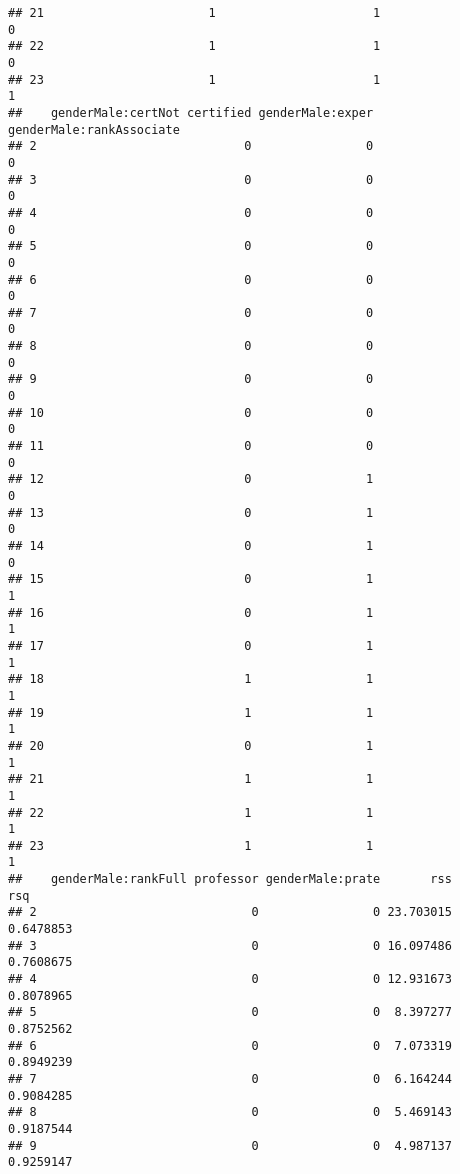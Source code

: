 \documentclass[]{article}
\begin{document}
\begin{verbatim}
## 21                       1                      1                       0
## 22                       1                      1                       0
## 23                       1                      1                       1
##    genderMale:certNot certified genderMale:exper genderMale:rankAssociate
## 2                             0                0                        0
## 3                             0                0                        0
## 4                             0                0                        0
## 5                             0                0                        0
## 6                             0                0                        0
## 7                             0                0                        0
## 8                             0                0                        0
## 9                             0                0                        0
## 10                            0                0                        0
## 11                            0                0                        0
## 12                            0                1                        0
## 13                            0                1                        0
## 14                            0                1                        0
## 15                            0                1                        1
## 16                            0                1                        1
## 17                            0                1                        1
## 18                            1                1                        1
## 19                            1                1                        1
## 20                            0                1                        1
## 21                            1                1                        1
## 22                            1                1                        1
## 23                            1                1                        1
##    genderMale:rankFull professor genderMale:prate       rss       rsq
## 2                              0                0 23.703015 0.6478853
## 3                              0                0 16.097486 0.7608675
## 4                              0                0 12.931673 0.8078965
## 5                              0                0  8.397277 0.8752562
## 6                              0                0  7.073319 0.8949239
## 7                              0                0  6.164244 0.9084285
## 8                              0                0  5.469143 0.9187544
## 9                              0                0  4.987137 0.9259147

\end{verbatim}
\end{document}
